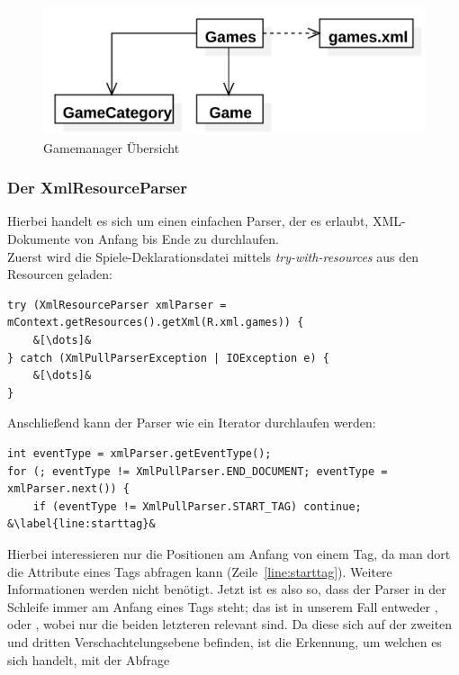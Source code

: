 \begin{figure}[h]
	\centering
	\includegraphics{resources/gamemanager/gamemanager_uml}
	\caption{Gamemanager Übersicht}
	\label{fig:gm_uml}
\end{figure}

\subsubsection{Der XmlResourceParser}

Hierbei handelt es sich um einen einfachen Parser, der es erlaubt, XML-Dokumente
von Anfang bis Ende zu durchlaufen.\\ Zuerst wird die Spiele-Deklarationsdatei
mittels \emph{try-with-resources} aus den Resourcen geladen:

\begin{lstlisting} 
try (XmlResourceParser xmlParser = mContext.getResources().getXml(R.xml.games)) {
	&[\dots]&
} catch (XmlPullParserException | IOException e) {
	&[\dots]&
}
\end{lstlisting}

Anschließend kann der Parser wie ein Iterator durchlaufen werden:

\begin{lstlisting}
int eventType = xmlParser.getEventType();
for (; eventType != XmlPullParser.END_DOCUMENT; eventType = xmlParser.next()) {
    if (eventType != XmlPullParser.START_TAG) continue; &\label{line:starttag}&
\end{lstlisting}

Hierbei interessieren nur die Positionen am Anfang von einem Tag, da man dort
die Attribute eines Tags abfragen kann (Zeile~\ref{line:starttag}). Weitere
Informationen werden nicht benötigt. Jetzt ist es also so, dass der Parser in
der Schleife immer am Anfang eines Tags steht; das ist in unserem Fall entweder
,  oder , wobei nur die beiden letzteren
relevant sind. Da diese sich auf der zweiten und dritten Verschachtelungsebene
befinden, ist die Erkennung, um welchen es sich handelt, mit der Abfrage

